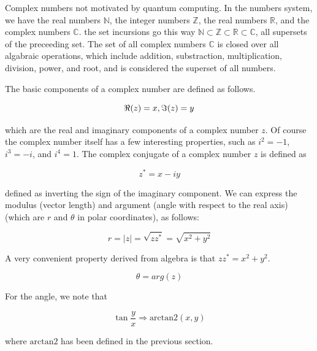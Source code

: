 \documentclass[12pt]{article}
\begin{document}






Complex numbers not motivated by quantum computing. In the numbers system, we have the real numbers $\mathbb{N}$, the integer numbers $\mathbb{Z}$, the real numbers $\mathbb{R}$, and the complex numbers $\mathbb{C}$. the set incursions go this way $\mathbb{N} \subset \mathbb{Z} \subset \mathbb{R} \subset \mathbb{C}$, all supersets of the preceeding set. The set of all complex numbers $\mathbb{C}$ is closed over all algabraic operations, which include addition, substraction, multiplication, division, power, and root, and is considered the superset of all numbers. 

\begin{definition}
    The basic components of a complex number are defined as follows. 

    $$\real(z) = x, \imaginary(z) = y$$

    which are the real and imaginary components of a complex number $z$. Of course the complex number itself has a few interesting properties, such as $i^2 = -1$, $i^3 = -i$, and $i^4 = 1$. The complex conjugate of a complex number $z$ is defined as 

    $$z^* = x - iy$$

    defined as inverting the sign of the imaginary component. We can express the modulus (vector length) and argument (angle with respect to the real axis) (which are $r$ and $\theta$ in polar coordinates), as follows:

    $$r = \vert z \vert = \sqrt{zz^*} = \sqrt{x^2 + y^2}$$

    A very convenient property derived from algebra is that $zz^* = x^2 + y^2$.

    $$\theta = arg(z)$$

    For the angle, we note that

    $$\tan \frac{y}{x} \Longrightarrow \mathrm{arctan2}(x, y)$$

    where $\mathrm{arctan2}$ has been defined in the previous section. 
\end{definition}
\end{document}
